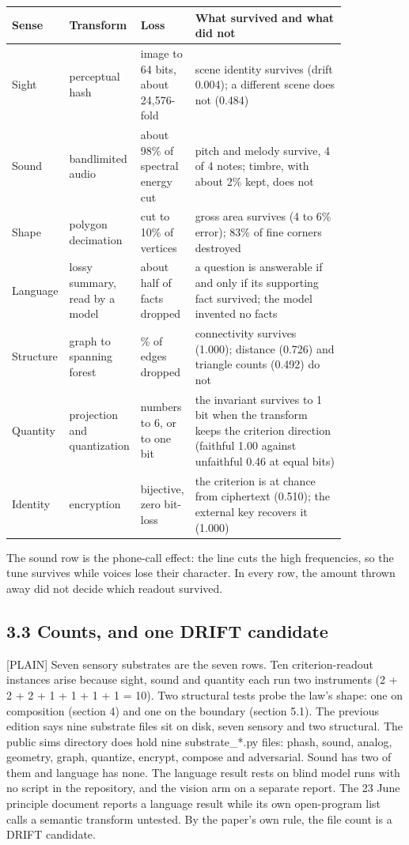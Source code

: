 \documentclass[11pt]{article}
\newcommand{\register}[1]{{\ttfamily\small #1}}
\begin{document}
{\small\begin{longtable}{>{\raggedright\arraybackslash}p{0.101\linewidth}>{\raggedright\arraybackslash}p{0.160\linewidth}>{\raggedright\arraybackslash}p{0.108\linewidth}>{\raggedright\arraybackslash}p{0.471\linewidth}}
\toprule
\textbf{Sense} & \textbf{Transform} & \textbf{Loss} & \textbf{What survived and what did not} \\ \midrule\endhead
Sight & perceptual hash & image to 64 bits, about 24,576-fold & scene identity survives (drift 0.004); a different scene does not (0.484) \\
Sound & bandlimited audio & about 98\% of spectral energy cut & pitch and melody survive, 4 of 4 notes; timbre, with about 2\% kept, does not \\
Shape & polygon decimation & cut to 10\% of vertices & gross area survives (4 to 6\% error); 83\% of fine corners destroyed \\
Language & lossy summary, read by a model & about half of facts dropped & a question is answerable if and only if its supporting fact survived; the model invented no facts \\
Structure & graph to spanning forest & 59\% of edges dropped & connectivity survives (1.000); distance (0.726) and triangle counts (0.492) do not \\
Quantity & projection and quantization & 48 numbers to 6, or to one bit & the invariant survives to 1 bit when the transform keeps the criterion direction (faithful 1.00 against unfaithful 0.46 at equal bits) \\
Identity & encryption & bijective, zero bit-loss & the criterion is at chance from ciphertext (0.510); the external key recovers it (1.000) \\
\bottomrule\end{longtable}}
The sound row is the phone-call effect: the line cuts the high frequencies, so the tune survives while voices lose their character. In every row, the amount thrown away did not decide which readout survived.

\subsection*{3.3 Counts, and one DRIFT candidate}

\register{[PLAIN]} Seven sensory substrates are the seven rows. Ten criterion-readout instances arise because sight, sound and quantity each run two instruments (2 + 2 + 2 + 1 + 1 + 1 + 1 = 10). Two structural tests probe the law's shape: one on composition (section 4) and one on the boundary (section 5.1). The previous edition says nine substrate files sit on disk, seven sensory and two structural. The public sims directory does hold nine substrate\_*.py files: phash, sound, analog, geometry, graph, quantize, encrypt, compose and adversarial. Sound has two of them and language has none. The language result rests on blind model runs with no script in the repository, and the vision arm on a separate report. The 23 June principle document reports a language result while its own open-program list calls a semantic transform untested. By the paper's own rule, the file count is a DRIFT candidate.
\end{document}
